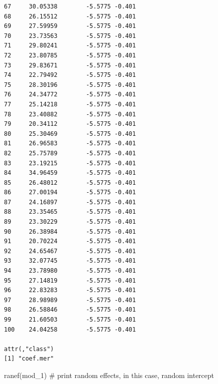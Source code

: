 \documentclass[
  letterpaper,
  DIV=11,
  numbers=noendperiod]{scrreprt}
\newenvironment{Shaded}{\begin{snugshade}}{\end{snugshade}}
\newcommand{\CommentTok}[1]{\textcolor[rgb]{0.37,0.37,0.37}{#1}}
\newcommand{\FunctionTok}[1]{\textcolor[rgb]{0.28,0.35,0.67}{#1}}
\newcommand{\NormalTok}[1]{\textcolor[rgb]{0.00,0.23,0.31}{#1}}
\begin{document}
\begin{verbatim}
67     30.05338        -5.5775 -0.401
68     26.15512        -5.5775 -0.401
69     27.59959        -5.5775 -0.401
70     23.73563        -5.5775 -0.401
71     29.80241        -5.5775 -0.401
72     23.80785        -5.5775 -0.401
73     29.83671        -5.5775 -0.401
74     22.79492        -5.5775 -0.401
75     28.30196        -5.5775 -0.401
76     24.34772        -5.5775 -0.401
77     25.14218        -5.5775 -0.401
78     23.40882        -5.5775 -0.401
79     20.34112        -5.5775 -0.401
80     25.30469        -5.5775 -0.401
81     26.96583        -5.5775 -0.401
82     25.75789        -5.5775 -0.401
83     23.19215        -5.5775 -0.401
84     34.96459        -5.5775 -0.401
85     26.48012        -5.5775 -0.401
86     27.00194        -5.5775 -0.401
87     24.16897        -5.5775 -0.401
88     23.35465        -5.5775 -0.401
89     23.30229        -5.5775 -0.401
90     26.38984        -5.5775 -0.401
91     20.70224        -5.5775 -0.401
92     24.65467        -5.5775 -0.401
93     32.07745        -5.5775 -0.401
94     23.78980        -5.5775 -0.401
95     27.14819        -5.5775 -0.401
96     22.83283        -5.5775 -0.401
97     28.98989        -5.5775 -0.401
98     26.58846        -5.5775 -0.401
99     21.60503        -5.5775 -0.401
100    24.04258        -5.5775 -0.401

attr(,"class")
[1] "coef.mer"
\end{verbatim}

\begin{Shaded}
\begin{Highlighting}[]
\FunctionTok{ranef}\NormalTok{(mod\_1)  }\CommentTok{\# print random effects, in this case, random intercept}
\end{Highlighting}
\end{Shaded}
\end{document}
